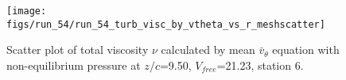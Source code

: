 \begin{figure}[H]
\centering
\texttt{[image: figs/run\_54/run\_54\_turb\_visc\_by\_vtheta\_vs\_r\_meshscatter]}
\caption{Scatter plot of total viscosity $\nu$ calculated by mean $\bar{v}_{\theta}$ equation with non-equilibrium pressure at $z/c$=9.50, $V_{free}$=21.23, station 6.}
\label{fig:run_54_turb_visc_by_vtheta_vs_r_meshscatter}
\end{figure}


